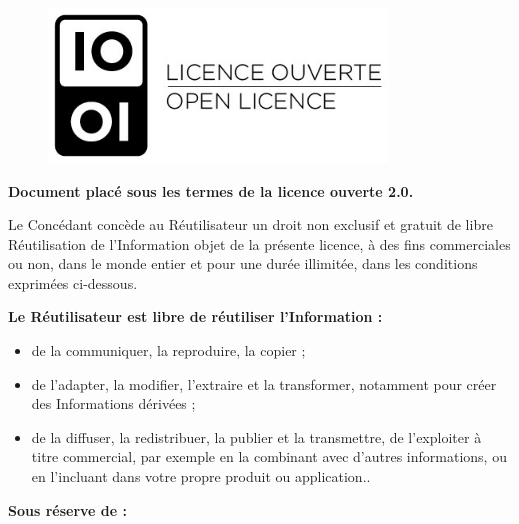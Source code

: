 \begin{center}
\begin{figure}
    \centering
    \includegraphics[width=9cm]{img/etalab-logo-full.jpg}
    \label{fig:licence}
\end{figure}

\bigskip

\bigskip

\textbf{Document placé sous les termes de la licence ouverte 2.0.}

\bigskip

Le \og Concédant \fg{} concède au \og Réutilisateur \fg{} un droit non exclusif et gratuit de libre  \og Réutilisation \fg{} de l'\og Information \fg{} objet de la présente licence, à des fins commerciales ou non, dans le monde entier et pour une durée illimitée, dans les conditions exprimées ci-dessous.

\end{center}

\bigskip

\textbf{Le \og Réutilisateur \fg{} est libre de réutiliser l'\og Information \fg{} :}

    \begin{itemize}
        \item de la communiquer, la reproduire, la copier ;
        \item de l'adapter, la modifier, l'extraire et la transformer, notamment pour créer des \og Informations dérivées \fg{} ;
        \item de la diffuser, la redistribuer, la publier et la transmettre, de l'exploiter à titre commercial, par exemple en la combinant avec d'autres informations, ou en l'incluant dans votre propre produit ou application..
    \end{itemize}

\bigskip

\textbf{Sous réserve de :}

